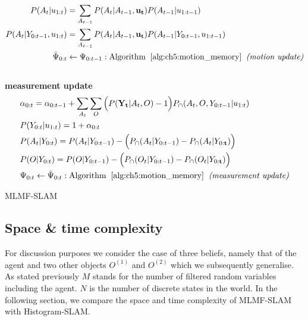 \begin{center}
\begin{minipage}{\linewidth}
\begin{algorithm}[H]
\vspace*{-0.5cm}
\nonl\begin{align}
P(A_t|u_{1:t})  	 &= \sum\limits_{A_{t-1}} P(A_t|A_{t-1},\mathbf{u_t})  P(A_{t-1}|u_{1:t-1}) \nonumber \\
P(A_t|Y_{0:t-1},u_{1:t}) &= \sum\limits_{A_{t-1}} P(A_t|A_{t-1},\mathbf{u_t})  P(A_{t-1}|Y_{0:t-1},u_{1:t-1}) \nonumber \\
\bar{\Psi}_{0:t} 	 &\gets \Psi_{0:t-1}: \mathrm{ Algorithm\;\; \ref{alg:ch5:motion_memory}\;\; \textit{(motion update)}} \nonumber
\end{align}
\vspace*{-1cm}
\BlankLine
\nonl\hrulefill	\\
\nonl\textbf{measurement update}
\nonl\begin{align}
 &\alpha_{0:t}       = \alpha_{0:t-1} + \sum\limits_{A_t}\sum\limits_{O} \Big(P(\mathbf{Y_t}|A_t,O) - 1\Big)P_{\cap}(A_t,O,Y_{0:t-1}|u_{1:t}) \nonumber \\
 &P(Y_{0:t}|u_{1:t}) = 1 + \alpha_{0:t} \nonumber\\
 &P(A_t|Y_{0:t})     = P(A_t|Y_{0:t-1}) - \Big(P_{\cap}(A_t|Y_{0:t-1}) -  P_{\cap}(A_t|Y_{0:\mathbf{t}}) \Big) \nonumber \\
 &P(O|Y_{0:t})       = P(O|Y_{0:t-1}) -  \Big(  P_{\cap}(O_t|Y_{0:t-1}) -  P_{\cap}(O_t|Y_{0:\mathbf{t}})\Big) \nonumber \\    
 &\Psi_{0:t} \gets \bar{\Psi}_{0:t}: \mathrm{Algorithm\;\; \ref{alg:ch5:motion_memory}\;\; \textit{(measurement update)}} \nonumber
 \end{align}
\caption{MLMF-SLAM}
\end{algorithm} 
\end{minipage}
\end{center}
\newpage

\subsection{Space \& time complexity}\label{ch5:space_time_complexity_MLMF}

For discussion purposes we consider the case of three beliefs, namely that of the agent and two other objects $O^{(1)}$ and $O^{(2)}$ which we
subsequently generalise. As stated previously $M$ stands for the number of filtered random variables including the agent. 
$N$ is the number of discrete states in the world. In the following section, we compare the space and time complexity 
of MLMF-SLAM with Histogram-SLAM.



